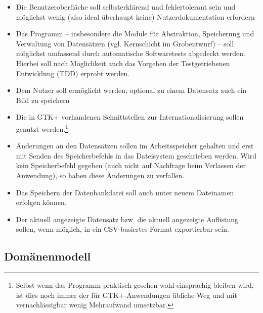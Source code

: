 \begin{itemize}
\item Die Benutzeroberfläche soll selbsterklärend und fehlertolerant sein und möglichst wenig (also ideal überhaupt keine)
Nutzerdokumentation erfordern
\item Das Programm -- insbesondere die Module für Abstraktion, Speicherung und Verwaltung von Datensätzen (vgl.
Kernschicht im Grobentwurf) -- soll möglichst umfassend durch automatische Softwaretests abgedeckt werden.
Hierbei soll nach Möglichkeit auch das Vorgehen der Testgetriebenen Entwicklung (TDD) erprobt werden.
\item Dem Nutzer soll ermöglicht werden, optional zu einem Datensatz auch ein Bild zu speichern
\item Die in GTK+ vorhandenen Schnittstellen zur Internationalisierung sollen genutzt werden.\footnote{Selbst wenn das
Programm praktisch gesehen wohl einsprachig bleiben wird, ist dies noch immer der für GTK+-Anwendungen übliche Weg
und mit vernachlässigbar wenig Mehraufwand umsetzbar.}
\item Änderungen an den Datensätzen sollen im Arbeitsspeicher gehalten und erst mit Senden des Speicherbefehls in das
Dateisystem geschrieben werden. Wird kein Speicherbefehl gegeben (auch nicht auf Nachfrage beim Verlassen der Anwendung),
so haben diese Änderungen zu verfallen.
\item Das Speichern der Datenbankdatei soll auch unter neuem Dateinamen erfolgen können.
\item Der aktuell angezeigte Datensatz bzw. die aktuell angezeigte Auflistung sollen, wenn möglich, in ein CSV-basiertes
Format exportierbar sein.
\end{itemize}

\subsection{Domänenmodell}